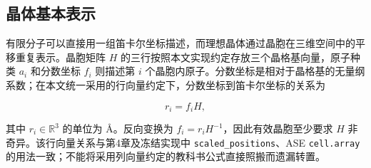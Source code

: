 \subsection{晶体基本表示}

有限分子可以直接用一组笛卡尔坐标描述，而理想晶体通过晶胞在三维空间中的平移重复表示。晶胞矩阵 \(H\) 的三行按照本文实现约定存放三个晶格基向量，原子种类 \(a_i\) 和分数坐标 \(f_i\) 则描述第 \(i\) 个晶胞内原子。分数坐标是相对于晶格基的无量纲系数；在本文统一采用的行向量约定下，分数坐标到笛卡尔坐标的关系为

\[
r_i=f_iH,
\tag{2-2}
\]

其中 \(r_i\in\mathbb R^3\) 的单位为 Å。反向变换为 \(f_i=r_iH^{-1}\)，因此有效晶胞至少要求 \(H\) 非奇异。该行向量关系与第4章及冻结实现中 \texttt{scaled\_positions}、ASE \texttt{cell.array} 的用法一致；不能将采用列向量约定的教科书公式直接照搬而遗漏转置。


